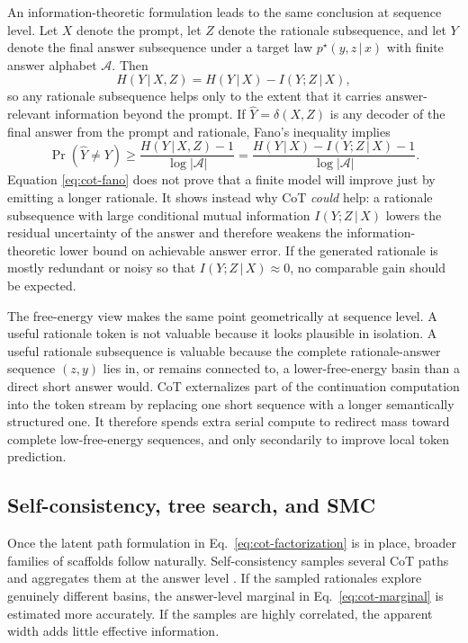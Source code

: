 \documentclass[aps,pre,reprint,superscriptaddress,nofootinbib]{revtex4-2}
\newcommand{\given}{\,|\,}
\begin{document}
An information-theoretic formulation leads to the same conclusion at sequence level. Let $X$ denote the prompt, let $Z$ denote the rationale subsequence, and let $Y$ denote the final answer subsequence under a target law $p^\star(y,z\given x)$ with finite answer alphabet $\mathcal{A}$. Then
\begin{equation}
H(Y\given X,Z)=H(Y\given X)-I(Y;Z\given X),
\label{eq:cot-cmi}
\end{equation}
so any rationale subsequence helps only to the extent that it carries answer-relevant information beyond the prompt. If $\hat Y=\delta(X,Z)$ is any decoder of the final answer from the prompt and rationale, Fano's inequality implies \cite{cover2006elements}
\begin{equation}
\Pr(\hat Y\neq Y)\ge \frac{H(Y\given X,Z)-1}{\log |\mathcal{A}|}
=
\frac{H(Y\given X)-I(Y;Z\given X)-1}{\log |\mathcal{A}|}.
\label{eq:cot-fano}
\end{equation}
Equation \eqref{eq:cot-fano} does not prove that a finite model will improve just by emitting a longer rationale. It shows instead why CoT \emph{could} help: a rationale subsequence with large conditional mutual information $I(Y;Z\given X)$ lowers the residual uncertainty of the answer and therefore weakens the information-theoretic lower bound on achievable answer error. If the generated rationale is mostly redundant or noisy so that $I(Y;Z\given X)\approx 0$, no comparable gain should be expected.

The free-energy view makes the same point geometrically at sequence level.
A useful rationale token is not valuable because it looks plausible in isolation. A useful rationale subsequence is valuable because the complete rationale-answer sequence $(z,y)$ lies in, or remains connected to, a lower-free-energy basin than a direct short answer would.
CoT externalizes part of the continuation computation into the token stream by replacing one short sequence with a longer semantically structured one.
It therefore spends extra serial compute to redirect mass toward complete low-free-energy sequences, and only secondarily to improve local token prediction.

\subsection{Self-consistency, tree search, and SMC}

Once the latent path formulation in Eq.~\eqref{eq:cot-factorization} is in place, broader families of scaffolds follow naturally.
 Self-consistency samples several CoT paths and aggregates them at the answer level \cite{wang2022self}.
 If the sampled rationales explore genuinely different basins, the answer-level marginal in Eq.~\eqref{eq:cot-marginal} is estimated more accurately.
 If the samples are highly correlated, the apparent width adds little effective information.
\end{document}
